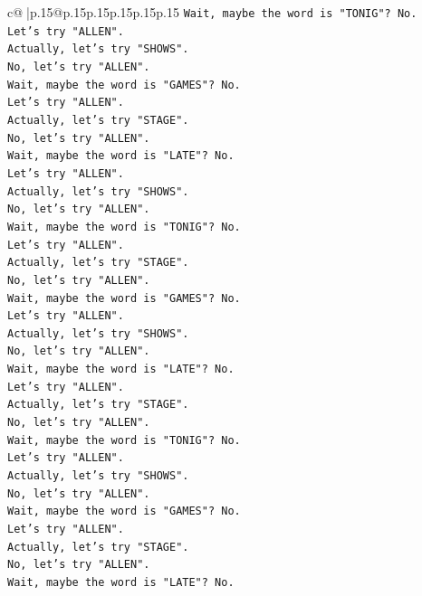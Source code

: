 \documentclass{article}
\begin{document}
{\begin{supertabular}{c@{$\;$}|p{.15\linewidth}@{}p{.15\linewidth}p{.15\linewidth}p{.15\linewidth}p{.15\linewidth}p{.15\linewidth}}
{{{\texttt{Wait, maybe the word is "TONIG"? No.} \\
\texttt{Let's try "ALLEN".} \\
\texttt{Actually, let's try "SHOWS".} \\
\texttt{No, let's try "ALLEN".} \\
\texttt{Wait, maybe the word is "GAMES"? No.} \\
\texttt{Let's try "ALLEN".} \\
\texttt{Actually, let's try "STAGE".} \\
\texttt{No, let's try "ALLEN".} \\
\texttt{Wait, maybe the word is "LATE"? No.} \\
\texttt{Let's try "ALLEN".} \\
\texttt{Actually, let's try "SHOWS".} \\
\texttt{No, let's try "ALLEN".} \\
\texttt{Wait, maybe the word is "TONIG"? No.} \\
\texttt{Let's try "ALLEN".} \\
\texttt{Actually, let's try "STAGE".} \\
\texttt{No, let's try "ALLEN".} \\
\texttt{Wait, maybe the word is "GAMES"? No.} \\
\texttt{Let's try "ALLEN".} \\
\texttt{Actually, let's try "SHOWS".} \\
\texttt{No, let's try "ALLEN".} \\
\texttt{Wait, maybe the word is "LATE"? No.} \\
\texttt{Let's try "ALLEN".} \\
\texttt{Actually, let's try "STAGE".} \\
\texttt{No, let's try "ALLEN".} \\
\texttt{Wait, maybe the word is "TONIG"? No.} \\
\texttt{Let's try "ALLEN".} \\
\texttt{Actually, let's try "SHOWS".} \\
\texttt{No, let's try "ALLEN".} \\
\texttt{Wait, maybe the word is "GAMES"? No.} \\
\texttt{Let's try "ALLEN".} \\
\texttt{Actually, let's try "STAGE".} \\
\texttt{No, let's try "ALLEN".} \\
\texttt{Wait, maybe the word is "LATE"? No.} \\
}}}
\end{supertabular}}
\end{document}
